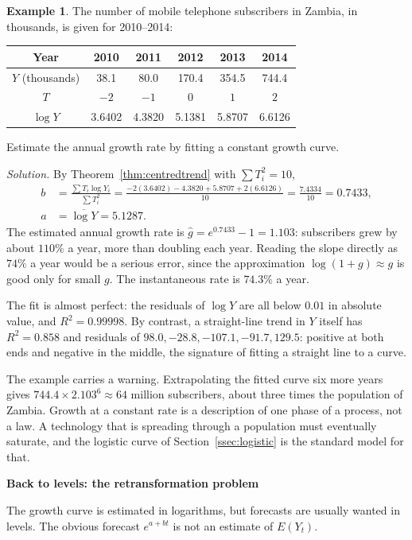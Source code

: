 \documentclass[11pt,a4paper]{article}
\numberwithin{equation}{section}
\theoremstyle{definition}
\newtheorem{exa}[thm]{Example}
\newcommand{\subhead}[1]{%
  \par\medskip\noindent\textbf{#1}\par\nobreak\smallskip}
\begin{document}
\begin{exa}
\label{ex:subs}
The number of mobile telephone subscribers in Zambia, in thousands, is given for 2010--2014:
\begin{center}
\begin{tabular}{c|ccccc}
Year & 2010 & 2011 & 2012 & 2013 & 2014\\\hline
$Y$ (thousands) & 38.1 & 80.0 & 170.4 & 354.5 & 744.4\\
$T$ & $-2$ & $-1$ & $0$ & $1$ & $2$\\
$\log Y$ & 3.6402 & 4.3820 & 5.1381 & 5.8707 & 6.6126
\end{tabular}
\end{center}
Estimate the annual growth rate by fitting a constant growth curve.

\emph{Solution.} By Theorem~\ref{thm:centredtrend} with $\sum T_i^2 = 10$,
\begin{align*}
b &= \frac{\sum T_i\log Y_i}{\sum T_i^2} = \frac{-2(3.6402) - 4.3820 + 5.8707 + 2(6.6126)}{10} = \frac{7.4334}{10} = 0.7433,\\
a &= \overline{\log Y} = 5.1287 .
\end{align*}
The estimated annual growth rate is $\hat g = e^{0.7433} - 1 = 1.103$: subscribers grew by about $110\%$ a year, more than doubling each year.
Reading the slope directly as $74\%$ a year would be a serious error, since the approximation $\log(1 + g) \approx g$ is good only for small $g$.
The instantaneous rate is $74.3\%$ a year.

The fit is almost perfect: the residuals of $\log Y$ are all below $0.01$ in absolute value, and $R^2 = 0.99998$. By contrast, a straight-line
trend in $Y$ itself has $R^2 = 0.858$ and residuals of $98.0, -28.8, -107.1, -91.7, 129.5$: positive at both ends and negative in the middle, the
signature of fitting a straight line to a curve.

The example carries a warning. Extrapolating the fitted curve six more years gives $744.4 \times 2.103^6 \approx 64$ million subscribers, about
three times the population of Zambia. Growth at a constant rate is a description of one phase of a process, not a law. A technology that is
spreading through a population must eventually saturate, and the logistic curve of Section~\ref{ssec:logistic} is the standard model for
that.
\end{exa}

\subhead{Back to levels: the retransformation problem}
The growth curve is estimated in logarithms, but forecasts are usually wanted in levels. The obvious forecast $e^{a + bt}$ is not an estimate of
$E(Y_t)$.
\end{document}
